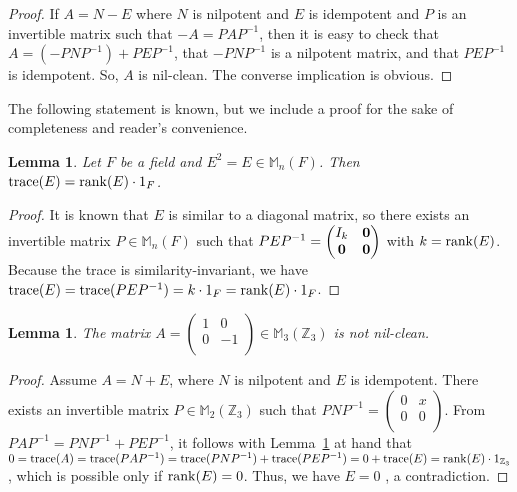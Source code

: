 \documentclass[12]{amsart}
\newtheorem{lem}[thm]{Lemma}
\theoremstyle{definition}
\numberwithin{equation}{section}
\begin{document}
\begin{proof}
If $A=N-E$ where $N$ is nilpotent and $E$ is idempotent and $P$ is an invertible  matrix such that $-A=PAP^{-1}$, then it is easy to check that $A=(-PNP^{-1})+PEP^{-1}$, that $-PNP^{-1}$ is a nilpotent matrix, and that $PEP^{-1}$ is idempotent. So, $A$ is nil-clean. The converse implication is obvious.
\end{proof}

The following statement is known, but we include a proof for the sake of completeness and reader's convenience.

\begin{lem}\label{trace=rank}
Let $F$ be a field and $E^2=E\in {\mathbb M}_n(F)$. Then ${\rm trace}(E)={\rm rank}(E)\cdot 1_F$.
\end{lem}
\begin{proof}
It is known that $E$ is similar to a diagonal matrix, so there exists an invertible matrix $P\in {\mathbb M}_n(F)$ such that
$PEP^{-1}=\begin{pmatrix}I_k&\bf 0\\
                       \bf 0&\bf 0\end{pmatrix}$ with $k={\rm rank}(E)$. Because the trace is similarity-invariant, we have
											${\rm trace}(E)={\rm trace}(PEP^{-1})=k\cdot 1_F={\rm rank}(E)\cdot 1_F$.
\end{proof}

\begin{lem}\label{2x2}
The matrix $A=\begin{pmatrix}
               1 & 0  \\
               0 & -1  \\
               \end{pmatrix}\in\mathbb{M}_3({{\mathbb Z}}_3)$
is not nil-clean.
\end{lem}

\begin{proof}
Assume $A=N+E$, where $N$ is nilpotent and $E$ is idempotent. There exists an invertible matrix $P\in {\mathbb M}_2(\mathbb Z_3)$ such that
$PNP^{-1}=\begin{pmatrix}
               0 & x  \\
               0 & 0  \\
               \end{pmatrix}$. From $PAP^{-1}=PNP^{-1}+PEP^{-1}$, it follows with Lemma~\ref{trace=rank} at hand that $0={\rm trace}(A)={\rm trace}(PAP^{-1})={\rm trace}(PNP^{-1})+{\rm trace}(PEP^{-1})=0+{\rm trace}(E)={\rm rank}(E)\cdot 1_{\mathbb Z_3}$, which is possible only if ${\rm rank}(E)=0$. Thus, we have $E=0$ , a contradiction.
\end{proof}
\end{document}
